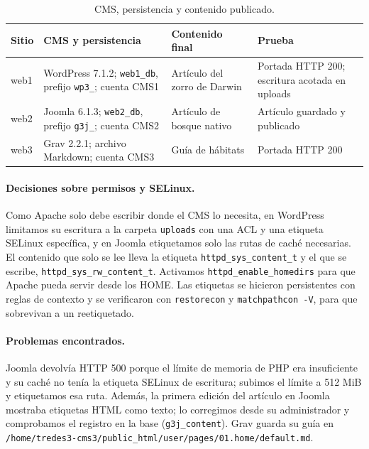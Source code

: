 \documentclass[11pt,a4paper]{article}
\newcommand{\ruta}[1]{\nolinkurl{#1}}
\begin{document}
\begin{table}[H]\centering\small
\caption{CMS, persistencia y contenido publicado.}\label{tab:cms}
\begin{tabular}{@{}p{1.6cm}p{3.6cm}p{3.9cm}p{4.0cm}@{}}\toprule
Sitio & CMS y persistencia & Contenido final & Prueba \\\midrule
web1 & WordPress 7.1.2; \texttt{web1\_db}, prefijo \texttt{wp3\_}; cuenta CMS1 & Artículo del zorro de Darwin & Portada HTTP 200; escritura acotada en uploads \\
web2 & Joomla 6.1.3; \texttt{web2\_db}, prefijo \texttt{g3j\_}; cuenta CMS2 & Artículo de bosque nativo & Artículo guardado y publicado \\
web3 & Grav 2.2.1; archivo Markdown; cuenta CMS3 & Guía de hábitats & Portada HTTP 200 \\
\bottomrule\end{tabular}
\end{table}

\paragraph{Decisiones sobre permisos y SELinux.} Como Apache solo debe escribir donde el CMS lo necesita, en WordPress limitamos su escritura a la carpeta \texttt{uploads} con una ACL y una etiqueta SELinux específica, y en Joomla etiquetamos solo las rutas de caché necesarias. El contenido que solo se lee lleva la etiqueta \texttt{httpd\_sys\_content\_t} y el que se escribe, \texttt{httpd\_sys\_rw\_content\_t}. Activamos \texttt{httpd\_enable\_homedirs} para que Apache pueda servir desde los HOME. Las etiquetas se hicieron persistentes con reglas de contexto y se verificaron con \texttt{restorecon} y \texttt{matchpathcon -V}, para que sobrevivan a un reetiquetado.

\paragraph{Problemas encontrados.} Joomla devolvía HTTP 500 porque el límite de memoria de PHP era insuficiente y su caché no tenía la etiqueta SELinux de escritura; subimos el límite a 512 MiB y etiquetamos esa ruta. Además, la primera edición del artículo en Joomla mostraba etiquetas HTML como texto; lo corregimos desde su administrador y comprobamos el registro en la base (\texttt{g3j\_content}). Grav guarda su guía en \ruta{/home/tredes3-cms3/public_html/user/pages/01.home/default.md}.
\end{document}

